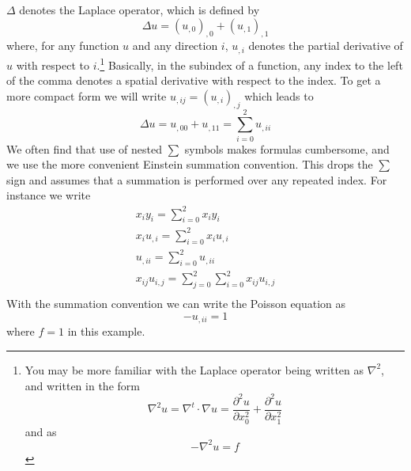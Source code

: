 $\Delta$ denotes the Laplace operator, which is defined by
\begin{equation}
\Delta u = (u_{,0})_{,0}+(u_{,1})_{,1}
\label{eq:FirstSteps.1.1}
\end{equation}
where, for any function $u$ and any direction $i$, $u_{,i}$
denotes the partial derivative  of $u$ with respect
to $i$.\footnote{You may be more familiar with the Laplace
operator being written as $\nabla^2$, and written in
the form
\begin{equation*}
    \nabla^2 u = \nabla^t \cdot \nabla u =  \frac{\partial^2 u}{\partial x_0^2} 
    + \frac{\partial^2 u}{\partial  x_1^2}
\end{equation*}
and  as
\begin{equation*}
    -\nabla^2 u = f
\end{equation*}
}
Basically, in the subindex of a function, any index to the left of the comma denotes a spatial derivative with respect 
to the index. To get a more compact form we will write $u_{,ij}=(u_{,i})_{,j}$
which leads to
\begin{equation}
\Delta u = u_{,00}+u_{,11}=\sum_{i=0}^2 u_{,ii}
\label{eq:FirstSteps.1.1b}
\end{equation}
We often find that use
of nested $\sum$ symbols makes formulas cumbersome, and we use the more
convenient Einstein summation convention. This 
drops the $\sum$ sign and assumes that a summation is performed over any repeated index.
For instance we write
\begin{eqnarray}
x_{i}y_{i}=\sum_{i=0}^2 x_{i}y_{i}   \\
x_{i}u_{,i}=\sum_{i=0}^2 x_{i}u_{,i}   \\
u_{,ii}=\sum_{i=0}^2 u_{,ii} \\
x_{ij}u_{i,j}=\sum_{j=0}^2\sum_{i=0}^2 x_{ij}u_{i,j}   \\
\label{eq:FirstSteps.1.1c}
\end{eqnarray}
With the summation convention we can write the Poisson equation  as
\begin{equation}
- u_{,ii} =1 
\label{eq:FirstSteps.1.sum}
\end{equation}
where $f=1$ in this example.

